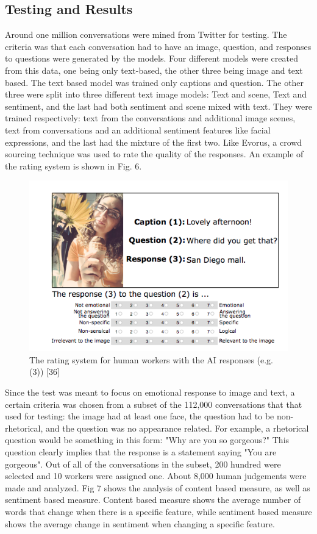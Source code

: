 \documentclass[letterpaper, 10 pt, conference]{IEEEtran}
\begin{document}
\subsection{Testing and Results}
Around one million conversations were mined from Twitter for testing. The criteria was that each conversation had to have an image, question, and responses to questions were generated by the models. Four different models were created from this data, one being only text-based, the other three being image and text based. The text based model was trained only captions and question. The other three were split into three different text image models: Text and scene, Text and sentiment, and the last had both sentiment and scene mixed with text. They were trained respectively: text from the conversations and additional image scenes, text from conversations and an additional sentiment features like facial expressions, and the last had the mixture of the first two. Like Evorus, a crowd sourcing technique was used to rate the quality of the responses. An example of the rating system is shown in Fig. 6. 


\begin{figure}[!ht]
\renewcommand\figurename{Fig.}
\centering
\includegraphics[width=\columnwidth]{rate}
\caption{The rating system for human workers with the AI responses (e.g. (3)) [36]}
\end{figure} 

\par Since the test was meant to focus on emotional response to image and text, a certain criteria was chosen from a subset of the 112,000 conversations that that used for testing: the image had at least one face, the question had to be non-rhetorical, and the question was no appearance related. For example, a rhetorical question would be something in this form: "Why are you so gorgeous?" This question clearly implies that the response is a statement saying "You are gorgeous". Out of all of the conversations in the subset, 200 hundred were selected and 10 workers were assigned one. About 8,000 human judgements were made and analyzed. Fig 7 shows the analysis of content based measure, as well as sentiment based measure. Content based measure shows the average number of words that change when there is a specific feature, while sentiment based measure shows the average change in sentiment when changing a specific feature.
\end{document}
